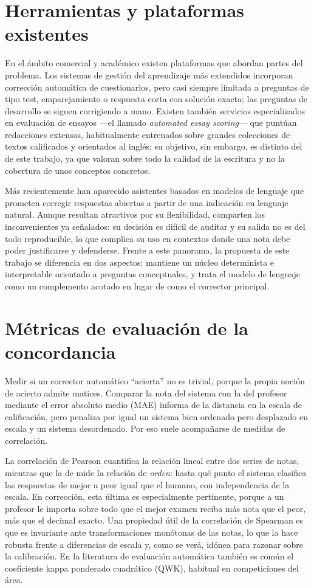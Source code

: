 \section{Herramientas y plataformas existentes}

En el ámbito comercial y académico existen plataformas que abordan partes del problema. Los sistemas de gestión del aprendizaje más extendidos incorporan corrección automática de cuestionarios, pero casi siempre limitada a preguntas de tipo test, emparejamiento o respuesta corta con solución exacta; las preguntas de desarrollo se siguen corrigiendo a mano. Existen también servicios especializados en evaluación de ensayos —el llamado \emph{automated essay scoring}— que puntúan redacciones extensas, habitualmente entrenados sobre grandes colecciones de textos calificados y orientados al inglés; su objetivo, sin embargo, es distinto del de este trabajo, ya que valoran sobre todo la calidad de la escritura y no la cobertura de unos conceptos concretos.

Más recientemente han aparecido asistentes basados en modelos de lenguaje que prometen corregir respuestas abiertas a partir de una indicación en lenguaje natural. Aunque resultan atractivos por su flexibilidad, comparten los inconvenientes ya señalados: su decisión es difícil de auditar y su salida no es del todo reproducible, lo que complica su uso en contextos donde una nota debe poder justificarse y defenderse. Frente a este panorama, la propuesta de este trabajo se diferencia en dos aspectos: mantiene un núcleo determinista e interpretable orientado a preguntas conceptuales, y trata el modelo de lenguaje como un complemento acotado en lugar de como el corrector principal.

\section{Métricas de evaluación de la concordancia}

Medir si un corrector automático ``acierta'' no es trivial, porque la propia noción de acierto admite matices. Comparar la nota del sistema con la del profesor mediante el error absoluto medio (MAE) informa de la distancia en la escala de calificación, pero penaliza por igual un sistema bien ordenado pero desplazado en escala y un sistema desordenado. Por eso suele acompañarse de medidas de correlación.

La correlación de Pearson cuantifica la relación lineal entre dos series de notas, mientras que la de \textcite{spearman1904} mide la relación de \emph{orden}: hasta qué punto el sistema clasifica las respuestas de mejor a peor igual que el humano, con independencia de la escala. En corrección, esta última es especialmente pertinente, porque a un profesor le importa sobre todo que el mejor examen reciba más nota que el peor, más que el decimal exacto. Una propiedad útil de la correlación de Spearman es que es invariante ante transformaciones monótonas de las notas, lo que la hace robusta frente a diferencias de escala y, como se verá, idónea para razonar sobre la calibración. En la literatura de evaluación automática también es común el coeficiente kappa ponderado cuadrático (QWK), habitual en competiciones del área.

